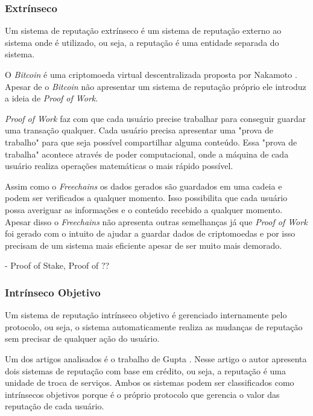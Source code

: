 \documentclass[12pt]{article}
\newcommand{\FC} {\emph{Freechains}\xspace}
\begin{document}
\subsubsection{Extrínseco} \label{subsub:extr}

Um sistema de reputação extrínseco é um sistema de reputação externo ao sistema onde é utilizado, ou seja, a reputação é uma entidade separada do sistema.


O \emph{Bitcoin} é uma criptomoeda virtual descentralizada proposta por Nakamoto \cite{nakamoto2008peer}. Apesar de o \emph{Bitcoin} não apresentar um sistema de reputação próprio ele introduz a ideia de \emph{Proof of Work}. 

\emph{Proof of Work} faz com que cada usuário precise trabalhar para conseguir guardar uma transação qualquer. Cada usuário precisa apresentar uma "prova de trabalho" para que seja possível compartilhar alguma conteúdo. Essa "prova de trabalha" acontece através de poder computacional, onde a máquina de cada usuário realiza operações matemáticas o mais rápido possível.

Assim como o \FC os dados gerados são guardados em uma cadeia e podem ser verificados a qualquer momento. Isso possibilita que cada usuário possa averiguar as informações e o conteúdo recebido a qualquer momento. Apesar disso o \FC não apresenta outras semelhanças já que \emph{Proof of Work} foi gerado com o intuito de ajudar a guardar dados de criptomoedas e por isso precisam de um sistema mais eficiente apesar de ser muito mais demorado.

- Proof of Stake, Proof of ??

\subsubsection{Intrínseco Objetivo} \label{subsub:intobj}

Um sistema de reputação intrínseco objetivo é gerenciado internamente pelo protocolo, ou seja, o sistema automaticamente realiza as mudanças de reputação sem precisar de qualquer ação do usuário. 

Um dos artigos analisados é o trabalho de Gupta \cite{gupta2003reputation}. Nesse artigo o autor apresenta dois  sistemas de reputação com base em crédito, ou seja, a reputação é uma unidade de troca de serviços. Ambos os sistemas podem ser classificados como intrínsecos objetivos porque é o próprio protocolo que gerencia o valor das reputação de cada usuário.
\end{document}
